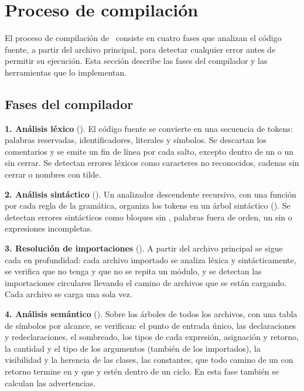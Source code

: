 \section{Proceso de compilación}

El proceso de compilación de \ggez\ consiste en cuatro fases que analizan el código fuente, a partir del archivo principal, para detectar cualquier error antes de permitir su ejecución. Esta sección describe las fases del compilador y las herramientas que lo implementan.

\subsection{Fases del compilador}

\textbf{1. Análisis léxico} (). El código fuente se convierte en una secuencia de tokens: palabras reservadas, identificadores, literales y símbolos. Se descartan los comentarios y se emite un fin de línea por cada salto, excepto dentro de un \kw{\{} o un \kw{<} sin cerrar. Se detectan errores léxicos como caracteres no reconocidos, cadenas sin cerrar o nombres con tilde.

\textbf{2. Análisis sintáctico} (). Un analizador descendente recursivo, con una función por cada regla de la gramática, organiza los tokens en un árbol sintáctico (). Se detectan errores sintácticos como bloques sin , palabras fuera de orden, un  sin  o expresiones incompletas.

\textbf{3. Resolución de importaciones} (). A partir del archivo principal se sigue cada  en profundidad: cada archivo importado se analiza léxica y sintácticamente, se verifica que no tenga  y que no se repita un módulo, y se detectan las importaciones circulares llevando el camino de archivos que se están cargando. Cada archivo se carga una sola vez.

\textbf{4. Análisis semántico} (). Sobre los árboles de todos los archivos, con una tabla de símbolos por alcance, se verifican: el punto de entrada único, las declaraciones y redeclaraciones, el sombreado, los tipos de cada expresión, asignación y retorno, la cantidad y el tipo de los argumentos (también de los  importados), la visibilidad y la herencia de las clases, las constantes, que todo camino de un  con retorno termine en  y que  y  estén dentro de un ciclo. En esta fase también se calculan las advertencias.

